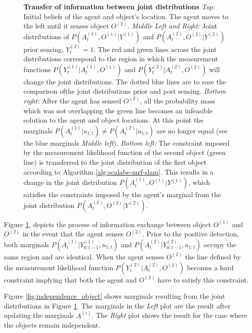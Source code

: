 \begin{figure}
  \centering
  \caption{\textbf{Transfer of information between joint distributions} 
  \textit{Top:} Initial beliefs of the agent and object's location. The agent moves to the left until it senses object $O^{(2)}$.
  \textit{Middle Left and Right:} Joint distributions of 
   $P(A^{(1)}_t,O^{(1)}|Y^{(1)})$ and $P(A^{(2)}_t,O^{(2)}|Y^{(2)})$ prior sensing, $Y_t^{(2)}=1$. The red and green lines across the joint distributions 
   correspond to the region in which the measurement functions $P(Y^{(1)}_{t}|A^{(1)}_t,O^{(1)})$ and $P(Y^{(2)}_{t}|A^{(2)}_t,O^{(2)})$ will change the joint distributions.
  The dotted blue lines are to ease the comparison ofthe joint distributions prior and post sensing.
  \textit{Bottom right:}  After the agent has sensed $O^{(2)}$, all the probability mass which was not overlapping the green line becomes an infeasible
  solution to the agent and object locations. At this point the marginals $P(A^{(1)}_t|u_{1:t}) \not= P(A^{(2)}_t|u_{1:t})$ are no longer equal 
  (see the blue marginals \textit{Middle left}). \textit{Bottom left:} The constraint imposed by the measurement likelihood function of the second object
  (green line) is transferred to the joint distribution of the first object according to Algorithm \ref{alg:scalabe-mrf-slam}.
  This results in a change in the joint distribution  $P(A^{(1)}_t,O^{(1)}|Y^{(1)})$, which satisfies the constraints 
  imposed by the agent's marginal from the joint distribution $P(A^{(2)}_t,O^{(2)}|Y^{(2)})$.}
  \label{fig:transfer_information}
\end{figure}

Figure \ref{fig:transfer_information}, depicts the process of information exchange between object $O^{(1)}$ and $O^{(2)}$ in the event that the agent 
senses $O^{(2)}$. Prior to the positive detection, both marginals $P(A^{(1)}_t|Y^{(1)}_{0:t-1},u_{1:t})$ and $P(A^{(2)}_t|Y^{(2)}_{0:t-1},u_{1:t})$ 
occupy the same region and are identical. When the agent senses $O^{(2)}$ the line defined by the measurement 
likelihood function $P(Y^{(2)}_t|A^{(2)}_t,O^{(2)})$ becomes a hard constraint implying that both the agent and $O^{(2)}$ have to satisfy this constraint.

Figure \ref{fig:independence_object} shows marginals resulting from the joint distributions in Figure \ref{fig:transfer_information}. The marginals in
the \textit{Left} plot are the result after updating the marginals $A^{(i)}$. The \textit{Right} plot shows the result for the case where the objects
remain independent. 

